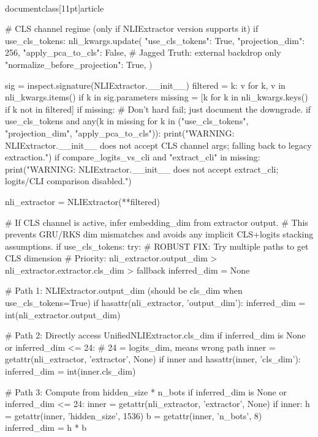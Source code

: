 \\documentclass[11pt]{article}
\begin{document}
\begin{CodeBlock}
    # CLS channel regime (only if NLIExtractor version supports it)
    if use_cls_tokens:
        nli_kwargs.update({
            "use_cls_tokens": True,
            "projection_dim": 256,
            "apply_pca_to_cls": False,  # Jagged Truth: external backdrop only
            "normalize_before_projection": True,
        })

    sig = inspect.signature(NLIExtractor.__init__)
    filtered = {k: v for k, v in nli_kwargs.items() if k in sig.parameters}
    missing = [k for k in nli_kwargs.keys() if k not in filtered]
    if missing:
        # Don't hard fail; just document the downgrade.
        if use_cls_tokens and any(k in missing for k in ("use_cls_tokens", "projection_dim", "apply_pca_to_cls")):
            print("WARNING: NLIExtractor.__init__ does not accept CLS channel args; falling back to legacy extraction.")
        if compare_logits_vs_cli and "extract_cli" in missing:
            print("WARNING: NLIExtractor.__init__ does not accept extract_cli; logits/CLI comparison disabled.")

    nli_extractor = NLIExtractor(**filtered)

    # If CLS channel is active, infer embedding_dim from extractor output.
    # This prevents GRU/RKS dim mismatches and avoids any implicit CLS+logits stacking assumptions.
    if use_cls_tokens:
        try:
            # ROBUST FIX: Try multiple paths to get CLS dimension
            # Priority: nli_extractor.output_dim > nli_extractor.extractor.cls_dim > fallback
            inferred_dim = None

            # Path 1: NLIExtractor.output_dim (should be cls_dim when use_cls_tokens=True)
            if hasattr(nli_extractor, 'output_dim'):
                inferred_dim = int(nli_extractor.output_dim)

            # Path 2: Directly access UnifiedNLIExtractor.cls_dim
            if inferred_dim is None or inferred_dim <= 24:  # 24 = logits_dim, means wrong path
                inner = getattr(nli_extractor, 'extractor', None)
                if inner and hasattr(inner, 'cls_dim'):
                    inferred_dim = int(inner.cls_dim)

            # Path 3: Compute from hidden_size * n_bots
            if inferred_dim is None or inferred_dim <= 24:
                inner = getattr(nli_extractor, 'extractor', None)
                if inner:
                    h = getattr(inner, 'hidden_size', 1536)
                    b = getattr(inner, 'n_bots', 8)
                    inferred_dim = h * b


\end{CodeBlock}
\end{document}
